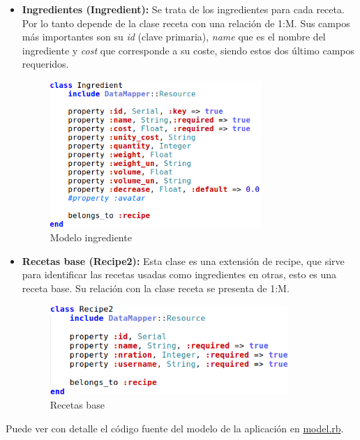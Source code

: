 \begin{itemize}
	\item \textbf{Ingredientes (Ingredient):} Se trata de los ingredientes para cada receta. Por lo tanto depende de la clase receta con una relación de 1:M. Sus campos más importantes son su \emph{id} (clave primaria), \emph{name} que es el nombre del ingrediente y \emph{cost} que corresponde a su coste, siendo estos dos último campos requeridos.

	\begin{figure}[H]
		\centering
		\includegraphics[width=8cm]{./images/chefmanagement-model-ingredient.png}
		\caption{Modelo ingrediente} \label{fig:chefmanagement-model-inredient}
	\end{figure}

	\item \textbf{Recetas base (Recipe2):} Esta clase es una extensión de recipe, que sirve para identificar las recetas usadas como ingredientes en otras, esto es una receta base. Su relación con la clase receta se presenta de 1:M.

	\begin{figure}[H]
		\centering
		\includegraphics[width=9cm]{./images/chefmanagement-model-recipe2.png}
		\caption{Recetas base} \label{fig:chefmanagement-model-recipe2}
	\end{figure}

\end{itemize}

Puede ver con detalle el código fuente del modelo de la aplicación en \href{https://github.com/alu0100207385/ChefManagement/blob/master/app/models/model.rb}{model.rb}.
